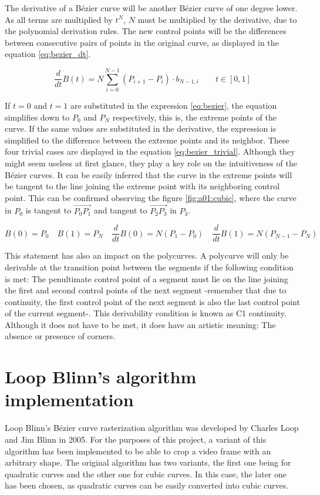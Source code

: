 \documentclass[\topdir/main.tex]{subfiles}
\begin{document}
The derivative of a Bézier curve will be another Bézier curve of one degree lower. As all terms are multiplied by $t^N$, $N$ must be multiplied by the derivative, due to the polynomial derivation rules. The new control points will be the differences between consecutive pairs of points in the original curve, as displayed in the equation \eqref{eq:bezier_dt}.

\begin{equation} \label{eq:bezier_dt}
    \frac{d}{dt} B(t) = N \sum_{i = 0}^{N-1} (P_{i+1} - P_i) \cdot b_{N-1,i} \qquad t \in [0, 1]
\end{equation}

If $t=0$ and $t=1$ are substituted in the expression \eqref{eq:bezier}, the equation simplifies down to $P_0$ and $P_N$ respectively, this is, the extreme points of the curve. If the same values are substituted in the derivative, the expression is simplified to the difference between the extreme points and its neighbor. These four trivial cases are displayed in the equation \eqref{eq:bezier_trivial}. Although they might seem useless at first glance, they play a key role on the intuitiveness of the Bézier curves. It can be easily inferred that the curve in the extreme points will be tangent to the line joining the extreme point with its neighboring control point. This can be confirmed observing the figure \ref{fig:a01:cubic}, where the curve in $P_0$ is tangent to $\overrightarrow{P_0P_1}$ and tangent to $\overrightarrow{P_2P_3}$ in $P_3$.\newline

\begin{equation} \label{eq:bezier_trivial}
    B(0) = P_0 \quad B(1) = P_N \quad \frac{d}{dt} B(0) = N(P_1 - P_0) \quad \frac{d}{dt} B(1) = N(P_{N-1} - P_N)
\end{equation}

This statement has also an impact on the polycurves. A polycurve will only be derivable at the transition point between the segments if the following condition is met: The penultimate control point of a segment must lie on the line joining the first and second control points of the next segment -remember that due to continuity, the first control point of the next segment is also the last control point of the current segment-. This derivability condition is known as C1 continuity. Although it does not have to be met, it does have an artistic meaning: The absence or presence of corners.

\section{Loop Blinn's algorithm implementation}
Loop Blinn's Bézier curve rasterization algorithm was developed by Charles Loop and Jim Blinn in 2005. For the purposes of this project, a variant of this algorithm has been implemented to be able to crop a video frame with an arbitrary shape. The original algorithm has two variants, the first one being for quadratic curves and the other one for cubic curves. In this case, the later one has been chosen, as quadratic curves can be easily converted into cubic curves.
\end{document}
